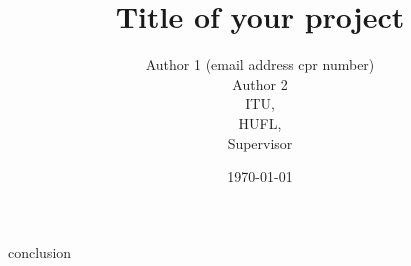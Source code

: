 \documentclass[12pt,a4paper]{report}
\author{Author 1 (email address cpr number) \\ Author 2 \\ 
		ITU, \\
		HUFL, \\
		Supervisor}
\title{Title of your project}
\date{\today} %
\begin{document}
\maketitle
\tableofcontents

{conclusion}


\end{document}
